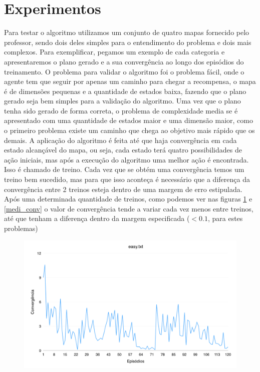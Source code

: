\documentclass[letterpaper]{article}
\begin{document}
\section{Experimentos}
Para testar o algoritmo utilizamos um conjunto de quatro mapas fornecido pelo professor, sendo dois deles simples para o entendimento do problema e dois mais complexos. Para exemplificar, pegamos um exemplo de cada categoria e apresentaremos o plano gerado e a sua convergência ao longo dos episódios do treinamento. O problema para validar o algoritmo foi o problema fácil, onde o agente tem que seguir por apenas um caminho para chegar a recompensa, o mapa é de dimensões pequenas e a quantidade de estados baixa, fazendo que o plano gerado seja bem simples para a validação do algoritmo. Uma vez que o plano tenha sido gerado de forma correta, o problema de complexidade media se é apresentado com uma quantidade de estados maior e uma dimensão maior, como o primeiro problema existe um caminho que chega ao objetivo mais rápido que os demais.
A aplicação do algoritmo é feita até que haja convergência em cada estado alcançável do mapa, ou seja, cada estado terá quatro possibilidades de ação iniciais, mas após a execução do algoritmo uma melhor ação é encontrada. Isso é chamado de treino. Cada vez que se obtém uma convergência temos um treino bem sucedido, mas para que isso aconteça é necessário que a diferença da convergência entre 2 treinos esteja dentro de uma margem de erro estipulada. Após uma determinada quantidade de treinos, como podemos ver nas figuras \ref{easy_conv} e \ref{medi_conv} o valor de convergência tende a variar cada vez menos entre treinos, até que tenham a diferença dentro da margem especificada ($<0.1$, para estes problemas)\\

\begin{figure}[ht]
\centering
\includegraphics[scale=0.192]{easy_map.png} %
\caption{}
\label{easy_conv}
\end{figure}
\end{document}
